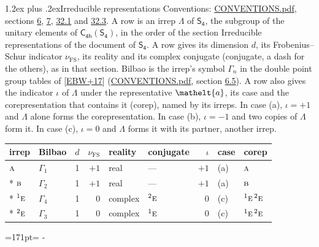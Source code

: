\documentclass[10pt,a4paper]{article}
\makeatletter
\renewcommand\section{\@startsection{section}{1}{\z@}{-3ex plus -1ex minus -.2ex}%
  {1.2ex plus .2ex}{\normalfont\large\sffamily\bfseries\color{parttitle}}}
\newcommand{\needspace}[1]{\par\penalty-100\begingroup\dimen0=#1\relax\dimen2=\pagegoal
  \advance\dimen2-\pagetotal\ifdim\dimen0>\dimen2\relax\ifdim\dimen2>0pt\vfil\break\fi\fi
  \endgroup}
\numberwithin{equation}{section}
\newcommand{\eltfont}[1]{{\let\sigma\eltsigma\mathelt{#1}}}
\newcommand{\grp}[1]{\mathsf{#1}}
\newcommand{\irr}[1]{\text{\normalfont\scshape #1}}
\newcommand{\conjpair}[1]{{}^{#1}}
\newcommand{\elt}[1]{\eltfont{#1}}
\newcommand{\fsind}{\nu_{\mathrm{FS}}}
\makeatother
\begin{document}
\section{Irreducible representations}\label{s:irreps}
Conventions: \href{../../CONVENTIONS.pdf}{CONVENTIONS.pdf}, sections \href{../../../rotation/CONVENTIONS.pdf\#conv.6}{6}, \href{../../../rotation/CONVENTIONS.pdf\#conv.7}{7}, \href{../../CONVENTIONS.pdf\#conv.32.1}{32.1} and \href{../../CONVENTIONS.pdf\#conv.32.3}{32.3}.
\leavevmode\label{n:irrep.Delta}A row is an irrep $\Lambda$ of $\grp{S_{4}}$, the subgroup of the unitary elements of $\grp{C_{4h}}(\grp{S_{4}})$, in the order of the section Irreducible representations of the document of \href{../../../rotation/data/pdf/S4.pdf}{$\grp{S_{4}}$}. \label{n:index.dimension}\label{n:index.frobenius}\label{n:head.irrep}\label{n:head.reality}\label{n:head.conjugate}A row gives its dimension $d$, its Frobenius--Schur indicator $\fsind$, its reality and its complex conjugate (conjugate, a dash for the others), as in that section. \label{n:head.bilbao}\label{n:irrep.alias.gamma}Bilbao is the irrep's symbol $\Gamma_n$ in the double point group tables of [\href{../../../REFERENCES.pdf\#ref.EBW+17}{EBW+17}] (\href{../../CONVENTIONS.pdf}{CONVENTIONS.pdf}, section \href{../../../rotation/CONVENTIONS.pdf\#conv.6.5}{6.5}). \label{n:head.case.corep}\label{n:head.corep}A row also gives the indicator $\iota$ of $\Lambda$ under the representative $\elt{a}$, its case and the corepresentation that contains it (corep), named by its irreps. In case (a), $\iota = +1$ and $\Lambda$ alone forms the corepresentation. In case (b), $\iota = -1$ and two copies of $\Lambda$ form it. In case (c), $\iota = 0$ and $\Lambda$ forms it with its partner, another irrep.
\setlength{\emergencystretch}{2em}\par\setlength{\emergencystretch}{0pt}
{\small\renewcommand{\arraystretch}{1.25}\setlength{\tabcolsep}{4pt}\begin{longtable}{@{}llrrllrll@{}}\toprule
irrep & Bilbao & $d$ & $\fsind$ & reality & conjugate & $\iota$ & case & corep\\\midrule\endhead
\bottomrule\endfoot\endlastfoot
$\irr{a}$ & $\Gamma_{1}$ & 1 & $+1$ & real & --- & $+1$ & (a) & $\irr{a}$\\*
$\irr{b}$ & $\Gamma_{2}$ & 1 & $+1$ & real & --- & $+1$ & (a) & $\irr{b}$\\*
$\conjpair{1}\irr{e}$ & $\Gamma_{4}$ & 1 & $0$ & complex & $\conjpair{2}\irr{e}$ & $0$ & (c) & $\conjpair{1}\irr{e}\,\conjpair{2}\irr{e}$\\*
$\conjpair{2}\irr{e}$ & $\Gamma_{3}$ & 1 & $0$ & complex & $\conjpair{1}\irr{e}$ & $0$ & (c) & $\conjpair{1}\irr{e}\,\conjpair{2}\irr{e}$\\
\bottomrule\end{longtable}}
\needspace{171pt}
\end{document}
